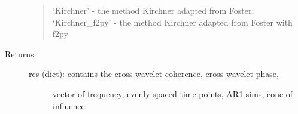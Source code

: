 \documentclass[letterpaper,10pt,english]{sphinxmanual}
\begin{document}
\begin{fulllineitems}
\begin{description}
\begin{quote}
‘Kirchner’ - the method Kirchner adapted from Foster;
‘Kirchner\_f2py’ - the method Kirchner adapted from Foster with f2py
\end{quote}

\item[{Returns:}] \leavevmode\begin{description}
\item[{res (dict): contains the cross wavelet coherence, cross-wavelet phase,}] \leavevmode
vector of frequency, evenly-spaced time points, AR1 sims, cone of influence

\end{description}

\end{description}

\end{fulllineitems}

\end{document}
